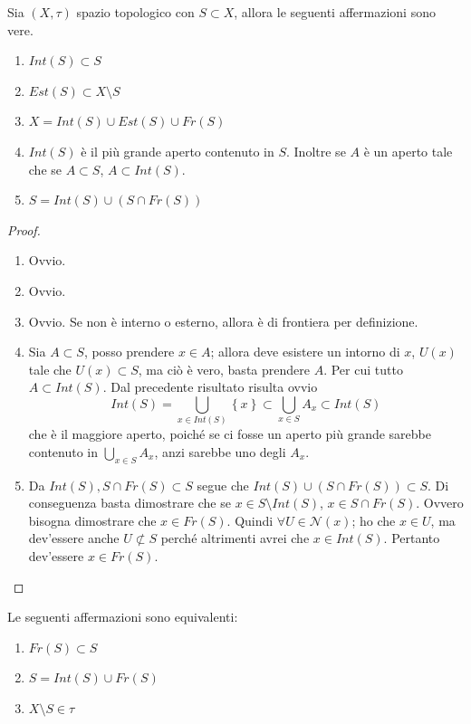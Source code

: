 \begin{proposition}
	Sia $(X,\tau)$ spazio topologico con $S \subset X$, allora le seguenti affermazioni sono vere.
	\begin{enumerate}
		\item $Int(S) \subset S$
		\item $Est(S) \subset X \setminus S$
		\item $X = Int(S) \cup Est(S) \cup Fr(S)$ 
		\item $Int(S)$ è il più grande aperto contenuto in $S$. Inoltre se $A$ è un aperto tale che se $A \subset S$, $A \subset Int(S)$.	
		\item $S = Int(S) \cup (S \cap Fr(S))$ \label{thr:set_decomposition_inner_frontier}
	\end{enumerate}
\end{proposition}
\begin{proof}
	\begin{enumerate}
		\item Ovvio.
		\item Ovvio.
		\item Ovvio. Se non è interno o esterno, allora è di frontiera per definizione.
		\item Sia $A \subset S$, posso prendere $x \in A$; allora deve esistere un intorno di $x$, $U(x)$ tale che $U(x) \subset S$, ma ciò è vero, basta prendere $A$. Per cui tutto $A \subset Int(S)$. Dal precedente risultato risulta ovvio
		\begin{equation*}
			Int(S) = \bigcup_{x\in Int(S)} \left\{x\right\} \subset \bigcup_{x \in S} A_x \subset Int(S) 
		\end{equation*}
		che è il maggiore aperto, poiché se ci fosse un aperto più grande sarebbe contenuto in $\bigcup_{x \in S} A_x$, anzi sarebbe uno degli $A_x$.
		\item Da $Int(S), S \cap Fr(S) \subset S$ segue che $Int(S) \cup (S \cap Fr(S)) \subset S$. Di conseguenza basta dimostrare che se $x \in S \setminus Int(S)$, $x \in S \cap Fr(S)$. Ovvero bisogna dimostrare che $x \in Fr(S)$. Quindi $\forall U \in \mathcal{N}(x)$; ho che $x \in U$, ma dev'essere anche $U \not \subset S$ perché altrimenti avrei che $x \in Int(S)$. Pertanto dev'essere $x \in Fr(S)$.
	\end{enumerate}
\end{proof}

\begin{theorem}
	Le seguenti affermazioni sono equivalenti:
	\begin{enumerate}
		\item $Fr(S) \subset S$
		\item $S = Int(S) \cup Fr(S)$
		\item $X \setminus S \in \tau$ 
	\end{enumerate}
\end{theorem}

